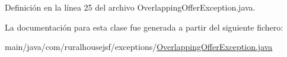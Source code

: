Definición en la línea 25 del archivo Overlapping\+Offer\+Exception.\+java.



La documentación para esta clase fue generada a partir del siguiente fichero\+:\begin{DoxyCompactItemize}
\item 
main/java/com/ruralhousejsf/exceptions/\mbox{\hyperlink{_overlapping_offer_exception_8java}{Overlapping\+Offer\+Exception.\+java}}\end{DoxyCompactItemize}

